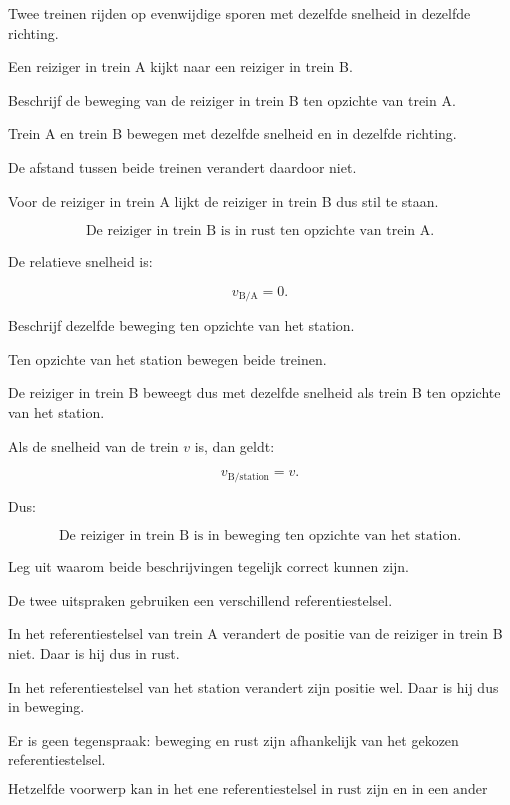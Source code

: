 \documentclass{ximera}
\begin{document}
\begin{oefening}{\oefU}

Twee treinen rijden op evenwijdige sporen met dezelfde snelheid in
dezelfde richting.

Een reiziger in trein A kijkt naar een reiziger in trein B.

\begin{question}
Beschrijf de beweging van de reiziger in trein B ten opzichte van
trein A.

\begin{oplossing}
Trein A en trein B bewegen met dezelfde snelheid en in dezelfde richting.

De afstand tussen beide treinen verandert daardoor niet.

Voor de reiziger in trein A lijkt de reiziger in trein B dus stil te staan.

\[
\boxed{\text{De reiziger in trein B is in rust ten opzichte van trein A.}}
\]

De relatieve snelheid is:

\[
v_{\mathrm{B/A}} = 0.
\]
\end{oplossing}
\end{question}


\begin{question}
Beschrijf dezelfde beweging ten opzichte van het station.

\begin{oplossing}
Ten opzichte van het station bewegen beide treinen.

De reiziger in trein B beweegt dus met dezelfde snelheid als trein B ten
opzichte van het station.

Als de snelheid van de trein $v$ is, dan geldt:

\[
v_{\mathrm{B/station}} = v.
\]

Dus:

\[
\boxed{\text{De reiziger in trein B is in beweging ten opzichte van het station.}}
\]
\end{oplossing}
\end{question}


\begin{question}
Leg uit waarom beide beschrijvingen tegelijk correct kunnen zijn.

\begin{oplossing}
De twee uitspraken gebruiken een verschillend referentiestelsel.

In het referentiestelsel van trein A verandert de positie van de reiziger
in trein B niet. Daar is hij dus in rust.

In het referentiestelsel van het station verandert zijn positie wel.
Daar is hij dus in beweging.

Er is geen tegenspraak: beweging en rust zijn afhankelijk van het gekozen
referentiestelsel.

\[
\boxed{
\text{Hetzelfde voorwerp kan in het ene referentiestelsel in rust zijn
en in een ander referentiestelsel bewegen.}
}
\]
\end{oplossing}
\end{question}

\end{oefening}
\end{document}
